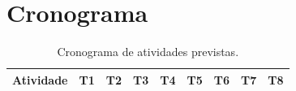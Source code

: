 \chapter{Cronograma}
\label{cap:cronograma}


\begin{table}[htb]
	\centering
	\caption{Cronograma de atividades previstas.}
	\label{tab:cronograma}
	\begin{tabular}{lcccccccc}
		\toprule
		\textbf{Atividade} & \textbf{T1} & \textbf{T2} & \textbf{T3} & \textbf{T4} & \textbf{T5} & \textbf{T6} & \textbf{T7} & \textbf{T8} \\
		\midrule
		\bottomrule
	\end{tabular}
\end{table}
